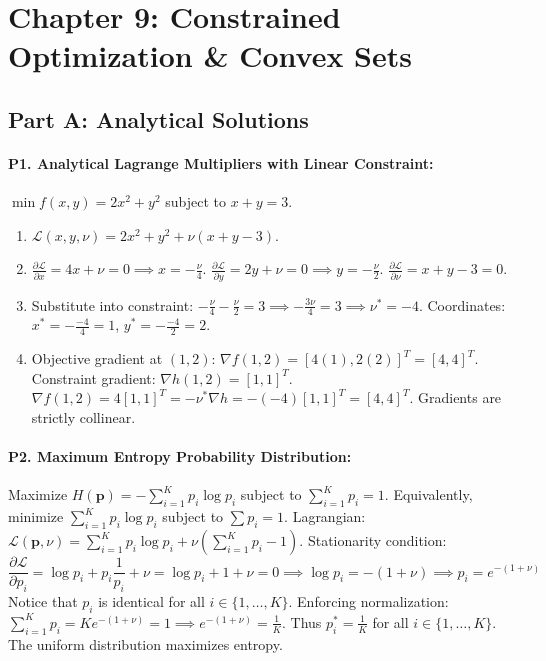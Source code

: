\section*{Chapter 9: Constrained Optimization \& Convex Sets}

\subsection*{Part A: Analytical Solutions}

\paragraph{P1. Analytical Lagrange Multipliers with Linear Constraint:}
$\min f(x, y) = 2x^2 + y^2$ subject to $x + y = 3$.
\begin{enumerate}[label=(\alph*)]
    \item $\mathcal{L}(x, y, \nu) = 2x^2 + y^2 + \nu(x + y - 3)$.
    \item $\frac{\partial \mathcal{L}}{\partial x} = 4x + \nu = 0 \implies x = -\frac{\nu}{4}$.
    $\frac{\partial \mathcal{L}}{\partial y} = 2y + \nu = 0 \implies y = -\frac{\nu}{2}$.
    $\frac{\partial \mathcal{L}}{\partial \nu} = x + y - 3 = 0$.
    \item Substitute into constraint: $-\frac{\nu}{4} - \frac{\nu}{2} = 3 \implies -\frac{3\nu}{4} = 3 \implies \nu^* = -4$.
    Coordinates: $x^* = -\frac{-4}{4} = 1$, $y^* = -\frac{-4}{2} = 2$.
    \item Objective gradient at $(1, 2)$: $\nabla f(1, 2) = [4(1), 2(2)]^T = [4, 4]^T$.
    Constraint gradient: $\nabla h(1, 2) = [1, 1]^T$.
    $\nabla f(1, 2) = 4 [1, 1]^T = -\nu^* \nabla h = -(-4)[1, 1]^T = [4, 4]^T$. Gradients are strictly collinear.
\end{enumerate}

\paragraph{P2. Maximum Entropy Probability Distribution:}
Maximize $H(\mathbf{p}) = -\sum_{i=1}^K p_i \log p_i$ subject to $\sum_{i=1}^K p_i = 1$.
Equivalently, minimize $\sum_{i=1}^K p_i \log p_i$ subject to $\sum p_i = 1$.
Lagrangian: $\mathcal{L}(\mathbf{p}, \nu) = \sum_{i=1}^K p_i \log p_i + \nu\left(\sum_{i=1}^K p_i - 1\right)$.
Stationarity condition:
\begin{equation*}
\frac{\partial \mathcal{L}}{\partial p_i} = \log p_i + p_i \frac{1}{p_i} + \nu = \log p_i + 1 + \nu = 0 \implies \log p_i = -(1 + \nu) \implies p_i = e^{-(1 + \nu)}
\end{equation*}
Notice that $p_i$ is identical for all $i \in \{1, \dots, K\}$.
Enforcing normalization: $\sum_{i=1}^K p_i = K e^{-(1 + \nu)} = 1 \implies e^{-(1 + \nu)} = \frac{1}{K}$.
Thus $p_i^* = \frac{1}{K}$ for all $i \in \{1, \dots, K\}$. The uniform distribution maximizes entropy.

